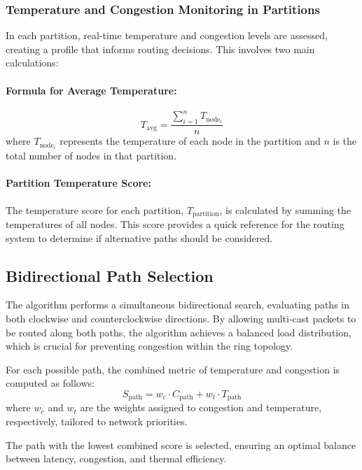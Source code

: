 \documentclass[conference]{IEEEtran}
\begin{document}
\subsubsection{Temperature and Congestion Monitoring in Partitions}
In each partition, real-time temperature and congestion levels are assessed, creating a profile that informs routing decisions. This involves two main calculations:

\paragraph{Formula for Average Temperature:}
\[
T_{\text{avg}} = \frac{\sum_{i=1}^{n} T_{\text{node}_i}}{n}
\]
where $T_{\text{node}_i}$ represents the temperature of each node in the partition and $n$ is the total number of nodes in that partition.

\paragraph{Partition Temperature Score:}
The temperature score for each partition, $T_{\text{partition}}$, is calculated by summing the temperatures of all nodes. This score provides a quick reference for the routing system to determine if alternative paths should be considered.

\subsection{Bidirectional Path Selection}
The algorithm performs a simultaneous bidirectional search, evaluating paths in both clockwise and counterclockwise directions. By allowing multi-cast packets to be routed along both paths, the algorithm achieves a balanced load distribution, which is crucial for preventing congestion within the ring topology.

For each possible path, the combined metric of temperature and congestion is computed as follows:
\[
S_{\text{path}} = w_c \cdot C_{\text{path}} + w_t \cdot T_{\text{path}}
\]
where $w_c$ and $w_t$ are the weights assigned to congestion and temperature, respectively, tailored to network priorities.

The path with the lowest combined score is selected, ensuring an optimal balance between latency, congestion, and thermal efficiency.
\end{document}
